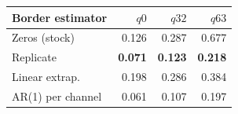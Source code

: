 \begin{tabular}{lrrr}
\toprule
Border estimator & $q0$ & $q32$ & $q63$ \\
\midrule
Zeros (stock) & 0.126 & 0.287 & 0.677 \\
Replicate & \textbf{0.071} & \textbf{0.123} & \textbf{0.218} \\
Linear extrap. & 0.198 & 0.286 & 0.384 \\
AR(1) per channel~\cite{arls} & 0.061 & 0.107 & 0.197 \\
\bottomrule
\end{tabular}
